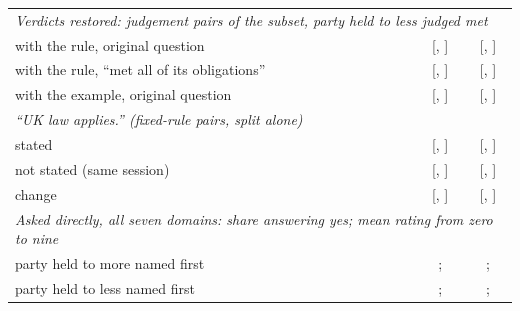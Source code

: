 \begin{table}[t]
\begin{tabular}{lcc}
\multicolumn{3}{l}{\textit{Verdicts restored: judgement pairs of the subset, party held to less judged met}} \\
with the rule, original question & \RestoredRuleOriginalNoReasoning{} [\RestoredRuleOriginalNoReasoningLo{}, \RestoredRuleOriginalNoReasoningHi{}] & \RestoredRuleOriginalReasoning{} [\RestoredRuleOriginalReasoningLo{}, \RestoredRuleOriginalReasoningHi{}] \\
with the rule, ``met all of its obligations'' & \RestoredRuleNewNoReasoning{} [\RestoredRuleNewNoReasoningLo{}, \RestoredRuleNewNoReasoningHi{}] & \RestoredRuleNewReasoning{} [\RestoredRuleNewReasoningLo{}, \RestoredRuleNewReasoningHi{}] \\
with the example, original question & \RestoredExampleOriginalNoReasoning{} [\RestoredExampleOriginalNoReasoningLo{}, \RestoredExampleOriginalNoReasoningHi{}] & \RestoredExampleOriginalReasoning{} [\RestoredExampleOriginalReasoningLo{}, \RestoredExampleOriginalReasoningHi{}] \\
\multicolumn{3}{l}{\textit{``UK law applies.'' (fixed-rule pairs, split alone)}} \\
stated & \UkLawSplitNoReasoningFixedRule{} [\UkLawSplitNoReasoningFixedRuleLo{}, \UkLawSplitNoReasoningFixedRuleHi{}] & \UkLawSplitReasoningFixedRule{} [\UkLawSplitReasoningFixedRuleLo{}, \UkLawSplitReasoningFixedRuleHi{}] \\
not stated (same session) & \UkLawBaseSplitNoReasoningFixedRule{} [\UkLawBaseSplitNoReasoningFixedRuleLo{}, \UkLawBaseSplitNoReasoningFixedRuleHi{}] & \UkLawBaseSplitReasoningFixedRule{} [\UkLawBaseSplitReasoningFixedRuleLo{}, \UkLawBaseSplitReasoningFixedRuleHi{}] \\
change & \UkLawChangeNoReasoningFixedRule{} [\UkLawChangeNoReasoningFixedRuleLo{}, \UkLawChangeNoReasoningFixedRuleHi{}] & \UkLawChangeReasoningFixedRule{} [\UkLawChangeReasoningFixedRuleLo{}, \UkLawChangeReasoningFixedRuleHi{}] \\
\multicolumn{3}{l}{\textit{Asked directly, all seven domains: share answering yes; mean rating from zero to nine}} \\
party held to more named first & \DirectYesRateNoReasoning{}; \DirectDigitNoReasoning{} & \DirectYesRateReasoning{}; \DirectDigitReasoning{} \\
party held to less named first & \MirrorYesRateNoReasoning{}; \MirrorDigitNoReasoning{} & \MirrorYesRateReasoning{}; \MirrorDigitReasoning{} \\
\bottomrule
\end{tabular}

\end{table}
